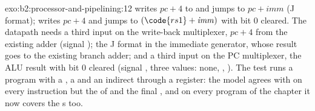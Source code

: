 \begin{solution}{exo:b2:processor-and-pipelining:12}
 writes $\mathit{pc} + 4$ to  and jumps to $\mathit{pc} + \mathit{imm}$ (J format);
 writes $\mathit{pc} + 4$ and jumps to $(\code{rs1} + \mathit{imm})$ with bit 0 cleared. The
datapath needs a third input on the write-back multiplexer, $\mathit{pc} + 4$ from the existing adder (signal
); the J format in the immediate generator, whose result goes to the existing branch adder; and a
third input on the PC multiplexer, the ALU result with bit 0 cleared (signal , three values: none,
, ).
The test runs a program with a , a  and an indirect  through a register: the model
agrees with  on every instruction but the  of  and the final , and on every
program of the chapter it now covers the s too.
\end{solution}


